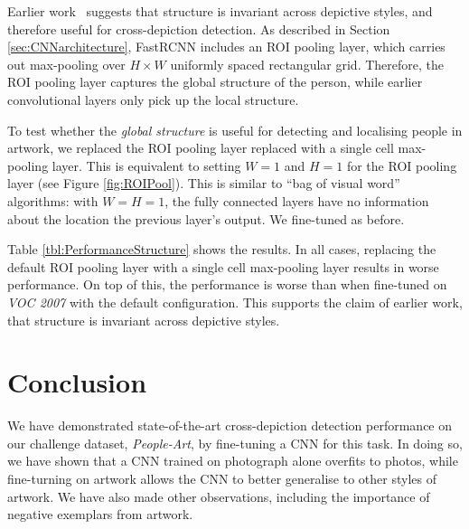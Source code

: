 \documentclass[runningheads]{llncs}
\begin{document}
Earlier work~\cite{wu2014learning,xiao2008structure,xiao2011learning} suggests that structure is invariant across depictive styles, and therefore useful for cross-depiction detection.
As described in Section \ref{sec:CNNarchitecture}, \ac{FastRCNN} includes an \ac{ROI} pooling layer, which carries out max-pooling over
\begin{math}
H \times W
\end{math}
uniformly spaced rectangular grid.
Therefore, the \ac{ROI} pooling layer captures the global structure of the person, while earlier convolutional layers only pick up the local structure.

To test whether the \emph{global structure} is useful for detecting and localising people in \ac{artwork}, we replaced the \ac{ROI} pooling layer replaced with a single cell max-pooling layer.
This is equivalent to setting
\begin{math}
  W=1
\end{math}
and
\begin{math}
  H=1
\end{math}
for the \ac{ROI} pooling layer (see Figure \ref{fig:ROIPool}).
This is similar to ``bag of visual word'' algorithms: with
\begin{math}
W=H=1
\end{math}, the fully connected layers have no information about the location the previous layer's output.
We fine-tuned as before.

Table \ref{tbl:PerformanceStructure} shows the results.
In all cases, replacing the default \ac{ROI} pooling layer with a single cell max-pooling layer results in worse performance.
On top of this, the performance is worse than when fine-tuned on \textit{VOC 2007} with the default configuration.
This supports the claim of earlier work, that structure is invariant across depictive styles.
 


\section{Conclusion}
We have demonstrated state-of-the-art cross-depiction detection performance on our challenge dataset, \textit{People-Art}, by fine-tuning a \ac{CNN} for this task.
In doing so, we have shown that a \ac{CNN} trained on photograph alone overfits to \acp{photo}, while fine-turning on \ac{artwork} allows the \ac{CNN} to better generalise to other styles of \ac{artwork}.
We have also made other observations, including the importance of negative exemplars from \ac{artwork}.
\end{document}
